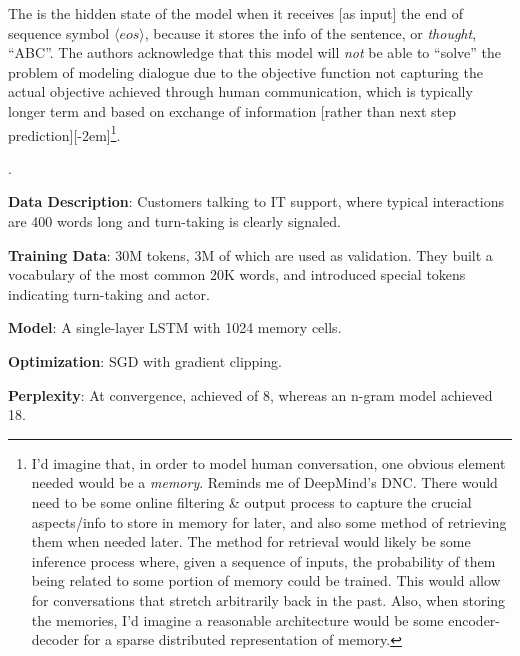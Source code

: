 \documentclass[11pt]{article}
\newcommand\myspace[1][]{\vspace{#1\bigskipamount}}
\newcommand\p{\Needspace{10\baselineskip} \noindent}
\begin{document}
\myspace
\p The  is the hidden state of the model when it receives [as input] the end of sequence symbol $\langle eos \rangle$, because it stores the info of the sentence, or \textit{thought}, ``ABC''. The authors acknowledge that this model will \textit{not} be able to ``solve'' the problem of modeling dialogue due to the objective function not capturing the actual objective achieved through human communication, which is typically longer term and based on exchange of information [rather than next step prediction][-2em]\footnote{I'd imagine that, in order to model human conversation, one obvious element needed would be a \textit{memory}. Reminds me of DeepMind's DNC. There would need to be some online filtering \& output process to capture the crucial aspects/info to store in memory for later, and also some method of retrieving them when needed later. The method for retrieval would likely be some inference process where, given a sequence of inputs, the probability of them being related to some portion of memory could be trained. This would allow for conversations that stretch arbitrarily back in the past. Also, when storing the memories, I'd imagine a reasonable architecture would be some encoder-decoder for a sparse distributed representation of memory.}.

\myspace
\p {}.
\begin{compactitem}
	\item \textbf{Data Description}: Customers talking to IT support, where typical interactions are 400 words long and turn-taking is clearly signaled. 
	
	\item \textbf{Training Data}: 30M tokens, 3M of which are used as validation. They built a vocabulary of the most common 20K words, and introduced special tokens indicating turn-taking and actor.
	
	\item \textbf{Model}: A single-layer LSTM with 1024 memory cells. 
	
	\item \textbf{Optimization}: SGD with gradient clipping.
	
	\item \textbf{Perplexity}: At convergence, achieved  of 8, whereas an n-gram model achieved 18.
\end{compactitem}
\end{document}
